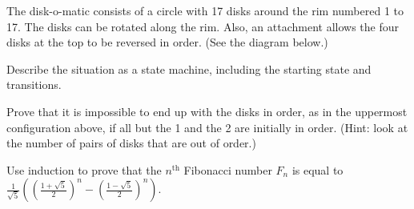 \documentclass[12pt,oneside]{article}
\newcommand{\mfigure}[3]{\bigskip\centerline{\resizebox{#1}{#2}{\texttt{[image: \#3]}}}\bigskip}
\begin{document}
\begin{problem}{15}
The disk-o-matic consists of a circle with 17 disks around the rim numbered 1 to 17.  The disks can be rotated along the rim.  Also, an attachment allows the four disks at the top to be reversed in order.  (See the diagram below.)

\mfigure{!}{3.5in}{circle}

\bparts


Describe the situation as a state machine, including the starting state and transitions.


Prove that it is impossible to end up with the disks in order, as in the uppermost configuration above, if all but the 1 and the 2 are initially in order.  (Hint: look at the number of pairs of disks that are out of order.)

\eparts
\end{problem}


\begin{problem}{15}
Use induction to prove that the $n^{\textrm{th}}$ Fibonacci number $F_n$ is equal to $\frac{1}{\sqrt{5}} \left( \left( \frac{1 + \sqrt{5}}{2} \right)^n - \left( \frac{1 - \sqrt{5}}{2} \right)^n \right)$.
\end{problem}

\newpage
\end{document}
